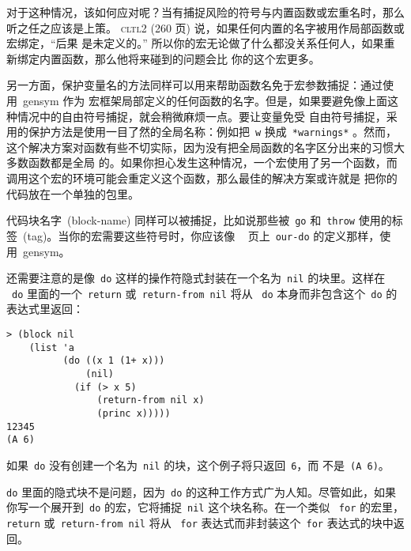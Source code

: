 对于这种情况，该如何应对呢？当有捕捉风险的符号与内置函数或宏重名时，那么听之任之应该是上策。
\textsc{cltl}2 (260 页) 说，如果任何内置的名字被用作局部函数或宏绑定，``后果
是未定义的。'' 所以你的宏无论做了什么都没关系\pozhehao{}任何人，如果重新绑定内置函数，那么他将来碰到的问题会比
你的这个宏更多。

另一方面，保护变量名的方法同样可以用来帮助函数名免于宏参数捕捉：通过使用~gensym 作为
宏框架局部定义的任何函数的名字。但是，如果要避免像上面这种情况中的自由符号捕捉，就会稍微麻烦一点。要让变量免受
自由符号捕捉，采用的保护方法是使用一目了然的全局名称：例如把~\verb|w| 换成~\verb|*warnings*|
。然而，这个解决方案对函数有些不切实际，因为没有把全局函数的名字区分出来的习惯\pozhehao{}大多数函数都是全局
的。如果你担心发生这种情况，一个宏使用了另一个函数，而调用这个宏的环境可能会重定义这个函数，那么最佳的解决方案或许就是
把你的代码放在一个单独的包里。

代码块名字~(block-name) 同样可以被捕捉，比如说那些被~\texttt{go} 和~\texttt{throw}
使用的标签~(tag)。当你的宏需要这些符号时，你应该像
~\pageref{fig:implementing_do} 页上~\texttt{our-do} 的定义那样，使用~gensym。

还需要注意的是像~\texttt{do} 这样的操作符隐式封装在一个名为~\texttt{nil} 的块里。这样在
~\texttt{do} 里面的一个~\texttt{return} 或~\texttt{return-from nil} 将从
~\texttt{do} 本身而非包含这个~\texttt{do} 的表达式里返回：\label{block_and_capture}
\begin{lstlisting}
> (block nil
    (list 'a
          (do ((x 1 (1+ x)))
              (nil)
            (if (> x 5)
                (return-from nil x)
                (princ x)))))
12345
(A 6)
\end{lstlisting}
如果~\texttt{do} 没有创建一个名为~\texttt{nil} 的块，这个例子将只返回~\texttt{6}，而
不是~\texttt{(A 6)}。

\texttt{do} 里面的隐式块不是问题，因为~\texttt{do} 的这种工作方式广为人知。尽管如此，如果
你写一个展开到~\texttt{do} 的宏，它将捕捉~\texttt{nil} 这个块名称。在一个类似
~\texttt{for} 的宏里，\texttt{return} 或~\texttt{return-from nil} 将从
~\texttt{for} 表达式而非封装这个~\texttt{for} 表达式的块中返回。

